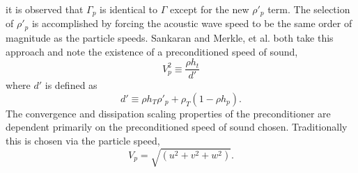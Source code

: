 \documentclass[draft]{aiaa-pretty}
\begin{document}
it is observed that $\Gamma_p$ is identical to $\Gamma$ except for the new $\rho'_p$ term.  The selection of $\rho'_p$ is accomplished by forcing the acoustic wave speed to
be the same order of magnitude as the particle speeds. Sankaran \cite{Venkateswaran1999} and Merkle, et al. \cite{Merkle1998} both take this approach and note the existence of 
a preconditioned speed of sound,
\begin{equation}
 V_p^2 \equiv \frac{\rho h_t}{d'}
 \label{SpeedofSound}
\end{equation}
where $d'$ is defined as
\begin{equation}
 d' \equiv \rho h_T \rho'_p+\rho_T\left(1-\rho h_p \right).
\end{equation}
The convergence and dissipation scaling properties of the preconditioner are dependent
primarily on the preconditioned speed of sound chosen.  Traditionally this is chosen via the particle speed, 
\begin{equation}
 V_p = \sqrt{\left(u^2+v^2+w^2\right)}.
\end{equation} 
\end{document}

